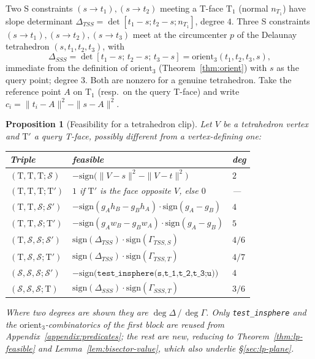 \documentclass[12pt]{article}
\newtheorem{proposition}[theorem]{Proposition}
\theoremstyle{definition}
\theoremstyle{remark}
\begin{document}
Two S constraints $(s\!\to\!t_1),(s\!\to\!t_2)$ meeting a T-face $\mathrm
T_1$ (normal $n_{T_1}$) have slope determinant
$\Delta_{TSS}=\det[t_1{-}s;t_2{-}s;n_{T_1}]$, degree $4$. Three S
constraints $(s\!\to\!t_1),(s\!\to\!t_2),(s\!\to\!t_3)$ meet at the
circumcenter $p$ of the Delaunay tetrahedron $(s,t_1,t_2,t_3)$, with
\begin{equation*}
    \Delta_{SSS} = \det[t_1{-}s;\,t_2{-}s;\,t_3{-}s] = \mathrm{orient}_3(t_1,t_2,t_3,s),
\end{equation*}
immediate from the definition of $\mathrm{orient}_3$ (Theorem~\ref{thm:orient})
with $s$ as the query point; degree $3$. Both are nonzero for a genuine
tetrahedron. Take the reference point $A$ on $\mathrm T_1$ (resp.\ on the
query T-face) and write $c_i=\|t_i-A\|^2-\|s-A\|^2$.

\begin{proposition}[Feasibility for a tetrahedron clip]\label{prop:tet-case-table}
Let $V$ be a tetrahedron vertex and $\mathrm T'$ a query T-face, possibly
different from a vertex-defining one:

\medskip
\begin{table}[h!]
\centering
\renewcommand{\arraystretch}{1.3}
\begin{tabular}{lll}
\hline
\textbf{Triple} & \textbf{feasible} & \textbf{deg} \\
\hline
$(\mathrm T,\mathrm T,\mathrm T;\mathcal S)$
    & $-\mathrm{sign}\big(\|V-s\|^2-\|V-t\|^2\big)$ & $2$ \\
$(\mathrm T,\mathrm T,\mathrm T;\mathrm T')$
    & $1$ if $\mathrm T'$ is the face opposite $V$, else $0$ & --- \\
\hline
$(\mathrm T,\mathrm T,\mathcal S;\mathcal S')$
    & $-\mathrm{sign}(g_Ah_B-g_Bh_A)\cdot\mathrm{sign}(g_A-g_B)$ & $4$ \\
$(\mathrm T,\mathrm T,\mathcal S;\mathrm T')$
    & $-\mathrm{sign}(g_Aw_B-g_Bw_A)\cdot\mathrm{sign}(g_A-g_B)$ & $5$ \\
\hline
$(\mathrm T,\mathcal S,\mathcal S;\mathcal S')$
    & $\mathrm{sign}(\Delta_{TSS})\cdot\mathrm{sign}(\Gamma_{TSS,S})$ & $4/6$ \\
$(\mathrm T,\mathcal S,\mathcal S;\mathrm T')$
    & $\mathrm{sign}(\Delta_{TSS})\cdot\mathrm{sign}(\Gamma_{TSS,T})$ & $4/7$ \\
\hline
$(\mathcal S,\mathcal S,\mathcal S;\mathcal S')$
    & $-\mathrm{sign}\big(\texttt{test\_insphere(s,t\_1,t\_2,t\_3;u)}\big)$ & $4$ \\
$(\mathcal S,\mathcal S,\mathcal S;\mathrm T)$
    & $\mathrm{sign}(\Delta_{SSS})\cdot\mathrm{sign}(\Gamma_{SSS,T})$ & $3/6$ \\
\hline
\end{tabular}
\end{table}
Where two degrees are shown they are $\deg\Delta\,/\,\deg\Gamma$. Only
\texttt{test\_insphere} and the $\mathrm{orient}_3$-combinatorics of the
first block are reused from Appendix~\ref{appendix:predicates}; the rest
are new, reducing to Theorem~\ref{thm:lp-feasible} and
Lemma~\ref{lem:bisector-value}, which also underlie \S\ref{sec:lp-plane}.
\end{proposition}
\end{document}

